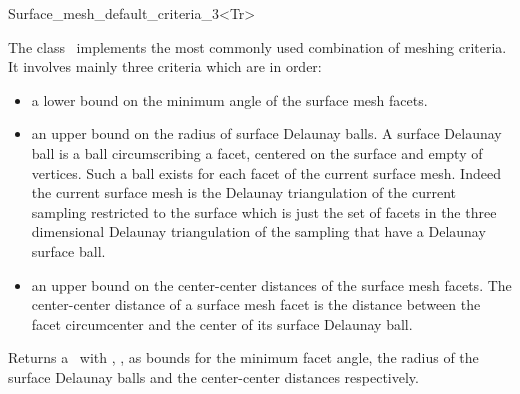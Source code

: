 
\begin{ccRefClass}{Surface_mesh_default_criteria_3<Tr>}

\ccDefinition
  
The class \ccRefName\  implements  the most commonly used combination
of meshing criteria. It involves mainly three criteria which are
in order: 
\begin{itemize}
\item
a lower bound on the minimum angle of the surface mesh facets. \\
\item an upper bound on the radius of surface Delaunay balls.
 A surface Delaunay ball is a  ball circumscribing  a facet,
centered on the surface and empty of vertices.
 Such a ball exists for each facet
of the current surface mesh.
Indeed  the current surface mesh
is  the Delaunay triangulation of the current sampling restricted to
the surface 
which is just the set of facets in the three dimensional  Delaunay triangulation of
the sampling  that  have a Delaunay surface ball. \\
\item an upper bound on the center-center distances of the surface mesh facets.
  The center-center distance of a surface mesh facet 
  is the distance between the facet circumcenter and the 
  center of its  surface Delaunay ball. 
\end{itemize}


\ccIsModel


\ccTypes


\ccCreation
{}

{Returns a \ccRefName\ with , ,
 as bounds for the minimum facet angle,
the radius of the surface Delaunay balls 
and the center-center distances respectively.}

\ccSeeAlso


\end{ccRefClass}


